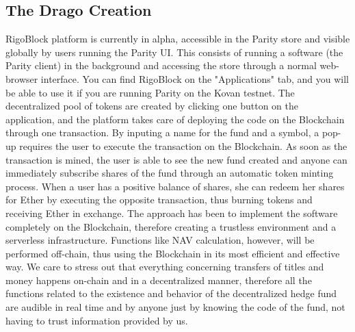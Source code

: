 \documentclass[9pt,oneside]{amsart}
\begin{document}
\begin{multicols}{2}
\subsection{The Drago Creation} \label{ch:block}
RigoBlock platform is currently in alpha, accessible in the Parity store and visible globally by users running the Parity UI. This consists of running a software (the Parity client) in the background and accessing the store through a normal web-browser interface. You can find RigoBlock on the "Applications" tab, and you will be able to use it if you are running Parity on the Kovan testnet.
The decentralized pool of tokens are created by clicking one button on the application, and the platform takes care of deploying the code on the Blockchain through one transaction. By inputing a name for the fund and a symbol, a pop-up requires the user to execute the transaction on the Blockchain. As soon as the transaction is mined, the user is able to see the new fund created and anyone can immediately subscribe shares of the fund through an automatic token minting process. When a user has a positive balance of shares, she can redeem her shares for Ether by executing the opposite transaction, thus burning tokens and receiving Ether in exchange.
The approach has been to implement the software completely on the Blockchain, therefore creating a trustless environment and a serverless infrastructure. Functions like NAV calculation, however, will be performed off-chain, thus using the Blockchain in its most efficient and effective way. We care to stress out that everything concerning transfers of titles and money happens on-chain and in a decentralized manner, therefore all the functions related to the existence and behavior of the decentralized hedge fund are audible in real time and by anyone just by knowing the code of the fund, not having to trust information provided by us.


\end{multicols}
\end{document}
